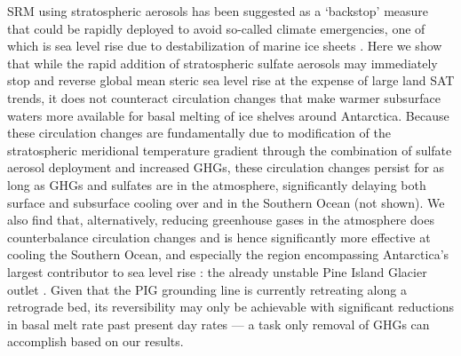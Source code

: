 \documentclass[draft,grl]{AGUTeX}  %
\begin{document}
\begin{article}
SRM using stratospheric aerosols has been suggested as a `backstop' measure that could be rapidly deployed to avoid so-called climate emergencies, one of which is sea level rise due to destabilization of marine ice sheets \citep{blackstock09}. Here we show that while the rapid addition of stratospheric sulfate aerosols may immediately stop and reverse global mean steric sea level rise at the expense of large land SAT trends, it does not counteract circulation changes that make warmer subsurface waters more available for basal melting of ice shelves around Antarctica. Because these circulation changes are fundamentally due to modification of the stratospheric meridional temperature gradient through the combination of sulfate aerosol deployment and increased GHGs, these circulation changes persist for as long as GHGs and sulfates are in the atmosphere, significantly delaying both surface and subsurface cooling over and in the Southern Ocean (not shown). We also find that, alternatively, reducing greenhouse gases in the atmosphere does counterbalance circulation changes and is hence significantly more effective at cooling the Southern Ocean, and especially the region encompassing Antarctica's largest contributor to sea level rise \citep{shepherd12}: the already unstable Pine Island Glacier outlet \citep{rignot14}. Given that the PIG grounding line is currently retreating along a retrograde bed, its reversibility may only be achievable with significant reductions in basal melt rate past present day rates \citep{favier14} --- a task only removal of GHGs can accomplish based on our results.


\end{article}
\end{document}
